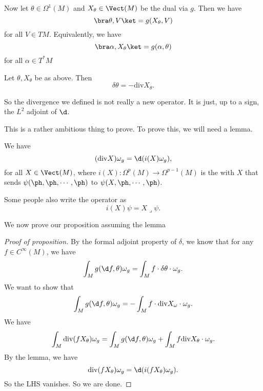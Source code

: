 \documentclass[a4paper]{article}
\renewcommand\div{\mathrm{div}}
\begin{document}
Now let $\theta \in \Omega^1(M)$ and $X_\theta \in \Vect(M)$ be the dual via $g$. Then we have
\[
  \bra \theta, V\ket = g(X_\theta, V)
\]
for all $V \in TM$. Equivalently, we have
\[
  \bra \alpha, X_\theta\ket = g(\alpha, \theta)
\]
for all $\alpha \in T^*M$

\begin{prop}
  Let $\theta, X_\theta$ be as above. Then
  \[
    \delta \theta = - \div X_\theta.
  \]
\end{prop}
So the divergence we defined is not really a new operator. It is just, up to a sign, the $L^2$ adjoint of $\d$.

This is a rather ambitious thing to prove. To prove this, we will need a lemma.

\begin{lemma}
  We have
  \[
    (\div X) \omega_g = \d(i(X)\omega_g),
  \]
  for all $X \in \Vect(M)$, where $i(X): \Omega^p(M) \to \Omega^{p - 1}(M)$ is the  with $X$ that sends $\psi(\ph, \ph, \cdots, \ph)$ to $\psi(X, \ph, \cdots, \ph)$.

  Some people also write the operator as
  \[
    i(X) \psi = X \lrcorner \psi.
  \]
\end{lemma}

We now prove our proposition assuming the lemma
\begin{proof}[Proof of proposition]
  By the formal adjoint property of $\delta$, we know that for any $f \in C^\infty(M)$, we have
  \[
    \int_M g(\d f, \theta) \omega_g = \int_M f \cdot \delta \theta \cdot \omega_g.
  \]
  We want to show that
  \[
    \int_M g(\d f, \theta) \omega_g = - \int_M f \cdot \div X_\omega \cdot \omega_g.
  \]
  We have
  \[
    \int_M \div (f X_\theta) \omega_g = \int_M g(\d f, \theta) \omega_g + \int_M f \div X_\theta \cdot \omega_g.
  \]
  By the lemma, we have
  \[
    \div(f X_\theta) \omega_g = \d (i(f X_\theta) \omega_g).
  \]
  So the LHS vanishes. So we are done.
\end{proof}
\end{document}
